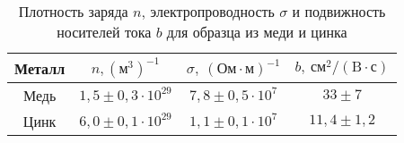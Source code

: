\begin{table}[H]
    \begin{tabular}{|c|c|c|c|}
        \hline
        Металл & $n, (\text{м}^3)^{-1}$ 
        & $\sigma, \
        (\text{Ом}\cdot\text{м})^{-1}$ &
        $b, \
        \text{см}^2/(\text{B}\cdot\text{с})$ 
        \\ \hline
        Медь & $1,5 \pm 0,3 \cdot
        10^{29}$ & $7,8\pm 0,5 \cdot
        10^{7}$ & $33 \pm 7$ \\ \hline
        Цинк & $6,0 \pm 0,1 \cdot 10^{29}$ & $1,1 \pm
        0,1 \cdot 10^7$ &  $11,4 \pm 1,2$\\ \hline
    \end{tabular}
    \captionsetup{justification=centering}
    \caption{Плотность заряда $n$,
    электропроводность $\sigma$ и
подвижность носителей тока $b$ для
образца из меди и цинка}
\end{table}

